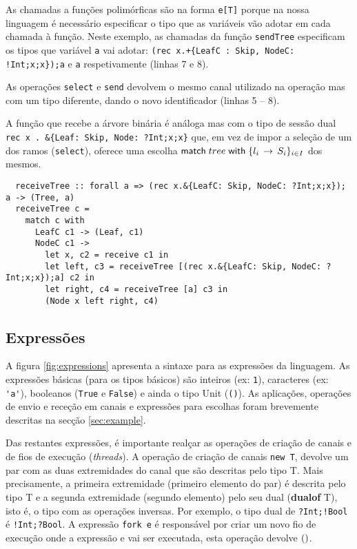 As chamadas a funções polimórficas são na forma \lstinline"e[T]" porque na nossa linguagem é necessário especificar o tipo que as variáveis vão adotar em cada chamada à função. Neste exemplo, as chamadas da função \lstinline"sendTree" especificam os tipos que variável \lstinline"a" vai adotar: \lstinline|(rec x.+{LeafC : Skip, NodeC: !Int;x;x});a| e \lstinline|a| respetivamente (linhas 7 e 8).

As operações \lstinline|select| e \lstinline|send| devolvem o mesmo canal utilizado na operação mas com um tipo diferente, dando o novo identificador (linhas 5 -- 8). 

A função que recebe a árvore binária é análoga mas com o tipo de sessão dual \lstinline"rec x . &{Leaf: Skip, Node: ?Int;x;x}" que, em vez de impor a seleção de um dos ramos (\lstinline"select"), oferece uma escolha $\mathsf{match}\;tree\;\mathsf{with}\;\{l_i\,\to\,S_i\}_{i\in I}$ dos mesmos.
\begin{lstlisting}
  receiveTree :: forall a => (rec x.&{LeafC: Skip, NodeC: ?Int;x;x}); a -> (Tree, a)
  receiveTree c =
    match c with
      LeafC c1 -> (Leaf, c1)
      NodeC c1 ->
        let x, c2 = receive c1 in
        let left, c3 = receiveTree [(rec x.&{LeafC: Skip, NodeC: ?Int;x;x});a] c2 in
        let right, c4 = receiveTree [a] c3 in
        (Node x left right, c4)
\end{lstlisting}


\subsection{Expressões}
A figura \ref{fig:expressions} apresenta a sintaxe para as expressões da linguagem. As expressões básicas (para os tipos básicos) são inteiros (ex: \lstinline"1"), caracteres (ex: \lstinline"'a'"), booleanos (\lstinline"True" e \lstinline"False") e ainda o tipo Unit (\lstinline|()|).
As aplicações, operações de envio e receção em canais e expressões para escolhas foram brevemente descritas na secção \ref{sec:example}.

Das restantes expressões, é importante realçar as operações de criação de canais e de fios de execução (\textit{threads}).
A operação de criação de canais \lstinline"new T", devolve um par com as duas extremidades do canal que são descritas pelo tipo T. Mais precisamente, a primeira extremidade (primeiro elemento do par) é descrita pelo tipo T e a segunda extremidade (segundo elemento) pelo seu dual (\textbf{dualof} T), isto é, o tipo com as operações inversas. Por exemplo, o tipo dual de \lstinline|?Int;!Bool| é \lstinline|!Int;?Bool|.
A expressão \lstinline"fork e" é responsável por criar um novo fio de execução onde a expressão e vai ser executada, esta operação devolve $()$.

